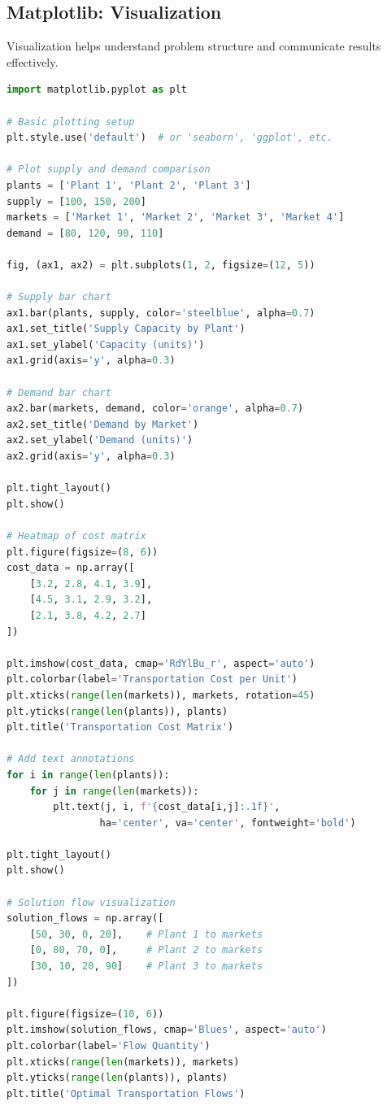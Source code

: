 \subsection{Matplotlib: Visualization}

Visualization helps understand problem structure and communicate results effectively.

\begin{lstlisting}[language=Python]
import matplotlib.pyplot as plt

# Basic plotting setup
plt.style.use('default')  # or 'seaborn', 'ggplot', etc.

# Plot supply and demand comparison
plants = ['Plant 1', 'Plant 2', 'Plant 3']
supply = [100, 150, 200]
markets = ['Market 1', 'Market 2', 'Market 3', 'Market 4']
demand = [80, 120, 90, 110]

fig, (ax1, ax2) = plt.subplots(1, 2, figsize=(12, 5))

# Supply bar chart
ax1.bar(plants, supply, color='steelblue', alpha=0.7)
ax1.set_title('Supply Capacity by Plant')
ax1.set_ylabel('Capacity (units)')
ax1.grid(axis='y', alpha=0.3)

# Demand bar chart
ax2.bar(markets, demand, color='orange', alpha=0.7)
ax2.set_title('Demand by Market')
ax2.set_ylabel('Demand (units)')
ax2.grid(axis='y', alpha=0.3)

plt.tight_layout()
plt.show()

# Heatmap of cost matrix
plt.figure(figsize=(8, 6))
cost_data = np.array([
    [3.2, 2.8, 4.1, 3.9],
    [4.5, 3.1, 2.9, 3.2],
    [2.1, 3.8, 4.2, 2.7]
])

plt.imshow(cost_data, cmap='RdYlBu_r', aspect='auto')
plt.colorbar(label='Transportation Cost per Unit')
plt.xticks(range(len(markets)), markets, rotation=45)
plt.yticks(range(len(plants)), plants)
plt.title('Transportation Cost Matrix')

# Add text annotations
for i in range(len(plants)):
    for j in range(len(markets)):
        plt.text(j, i, f'{cost_data[i,j]:.1f}', 
                ha='center', va='center', fontweight='bold')

plt.tight_layout()
plt.show()

# Solution flow visualization
solution_flows = np.array([
    [50, 30, 0, 20],    # Plant 1 to markets
    [0, 80, 70, 0],     # Plant 2 to markets
    [30, 10, 20, 90]    # Plant 3 to markets
])

plt.figure(figsize=(10, 6))
plt.imshow(solution_flows, cmap='Blues', aspect='auto')
plt.colorbar(label='Flow Quantity')
plt.xticks(range(len(markets)), markets)
plt.yticks(range(len(plants)), plants)
plt.title('Optimal Transportation Flows')


\end{lstlisting}
